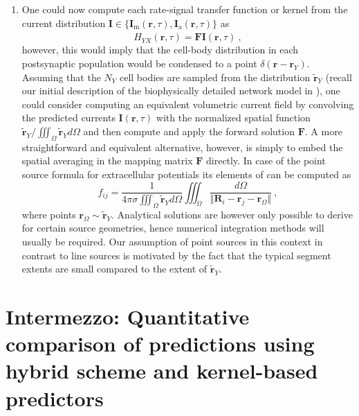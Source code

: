 \begin{enumerate}
\item One could now compute each rate-signal transfer function or kernel from the current distribution
$\mathbf{I} \in \{ \mathbf{I}_\text{m}(\mathbf{r}, \tau), \mathbf{I}_\text{a}(\mathbf{r}, \tau) \}$ as
\begin{equation}
\hat{H}_{YX}(\mathbf{r}, \tau) = \mathbf{F}\mathbf{I}(\mathbf{r}, \tau) ~,
\end{equation}
however, this would imply that the cell-body distribution in each postsynaptic population would be condensed to a point $\delta(\mathbf{r} - \mathbf{r}_Y)$.
Assuming that the $N_Y$ cell bodies are sampled from the distribution $\widetilde{\mathbf{r}}_Y$
(recall our initial description of the biophysically detailed network model in ),
one could consider computing an equivalent volumetric current field by convolving the predicted currents $\mathbf{I}(\mathbf{r}, \tau)$ with the normalized spatial function
$\widetilde{\mathbf{r}}_Y / \iiint_\Omega \widetilde{\mathbf{r}}_Y d\Omega$
and then compute and apply the forward solution $\mathbf{F}$.
A more straightforward and equivalent alternative, however,
is simply to embed the spatial averaging in the mapping matrix $\mathbf{F}$ directly.
In case of the point source formula for extracellular potentials its elements of can be computed as
\begin{equation}
f_{ij} = \frac{1}{4 \pi \sigma \iiint_\Omega \widetilde{\mathbf{r}}_Y d\Omega}
	\iiint_\Omega \frac{d\Omega}{\Vert \mathbf{R}_i - \mathbf{r}_j - \mathbf{r}_\Omega \Vert}~, 
\end{equation}
where points $\mathbf{r}_\Omega \sim \widetilde{\mathbf{r}}_Y$. 
Analytical solutions are however only possible to derive for certain source geometries, 
hence numerical integration methods will usually be required. 
Our assumption of point sources in this context in contrast to line sources is motivated by the fact that the typical segment extents are small compared to the extent of $\widetilde{\mathbf{r}}_Y$.

\end{enumerate}


\section{Intermezzo: Quantitative comparison of predictions using hybrid scheme and kernel-based predictors}
\label{sec:Schemes:comparison}




